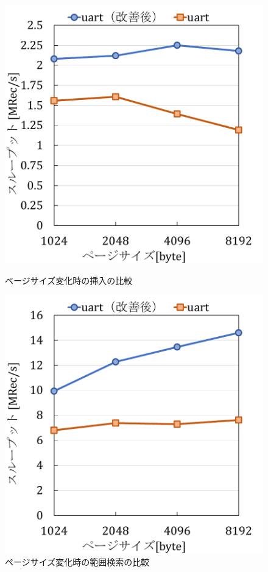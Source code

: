 \begin{figure}[tb]
  \begin{minipage}[c]{0.495\textwidth}
    \centering
    \includegraphics[scale=0.5]{./figures/graph-pagesize-insert.pdf}
    \caption{ページサイズ変化時の挿入の比較}
    \label{graph:ps-in}
  \end{minipage}
  \begin{minipage}[c]{0.495\textwidth}
    \centering
    \includegraphics[scale=0.5]{./figures/graph-pagesize-scan.pdf}
    \caption{ページサイズ変化時の範囲検索の比較}
    \label{graph:ps-sc}
  \end{minipage}
\end{figure}

